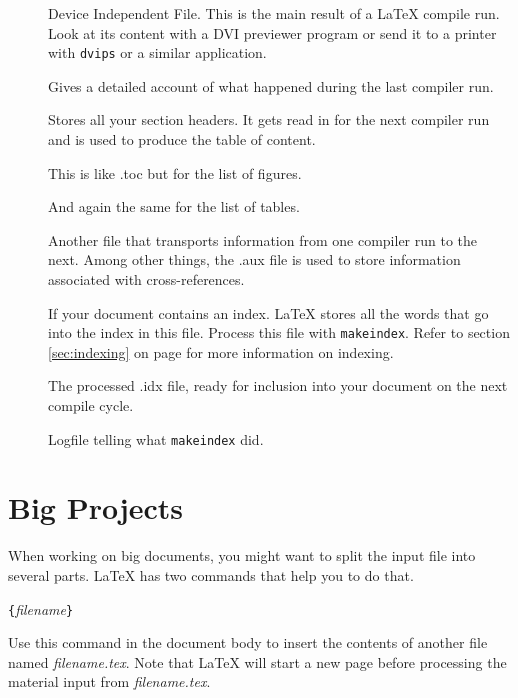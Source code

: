 \begin{description}
\item[] Device Independent File. This is the main result of a \LaTeX{}
  compile run. Look at its content with a DVI previewer
  program or send it to a printer with \texttt{dvips} or a
  similar application.
\item[] Gives a detailed account of what happened during the
  last compiler run.
\item[] Stores all your section headers. It gets read in for the
  next compiler run and is used to produce the table of content.
\item[] This is like .toc but for the list of figures.
\item[] And again the same for the list of tables.
\item[] Another file that transports information from one
  compiler run to the next. Among other things, the .aux file is used
  to store information associated with cross-references.
\item[] If your document contains an index. \LaTeX{} stores all
  the words that go into the index in this file. Process this file with
  \texttt{makeindex}. Refer to section \ref{sec:indexing} on
  page \pageref{sec:indexing} for more information on indexing.
\item[] The processed .idx file, ready for inclusion into your
  document on the next compile cycle.
\item[] Logfile telling what \texttt{makeindex} did.
\end{description}


%
%



%

\section{Big Projects}
When working on big documents, you might want to split the input file
into several parts. \LaTeX{} has two commands that help you to do
that.

\begin{lscommand}
\verb|{|\emph{filename}\verb|}|
\end{lscommand}
\noindent Use this command in the document body to insert the
contents of another file named \emph{filename.tex}. Note that \LaTeX{}
will start a new page
before processing the material input from \emph{filename.tex}.

